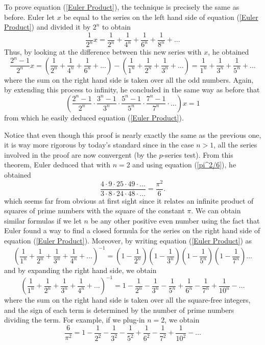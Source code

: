 To prove equation (\ref{Euler Product}), the technique is precisely the same as before. Euler let $x$ be equal to the series on the left hand side of equation (\ref{Euler Product}) and divided it by $2^n$ to obtain
$$\frac{1}{2^n}x = \frac{1}{2^n} + \frac{1}{4^n} + \frac{1}{6^n} + \frac{1}{8^n} + \dots$$
Thus, by looking at the difference between this new series with $x$, he obtained
$$\frac{2^n - 1}{2^n}x = \left(\frac{1}{2^n} + \frac{1}{4^n} + \frac{1}{6^n}  + \dots\right) - \left(\frac{1}{1^n} + \frac{1}{2^n} + \frac{1}{3^n} + \dots\right) = \frac{1}{1^n} + \frac{1}{3^n} + \frac{1}{5^n} + \dots$$
where the sum on the right hand side is taken over all the odd numbers. Again, by extending this process to infinity, he concluded in the same way as before that
$$\left(\frac{2^n - 1}{2^n}\cdot\frac{3^n - 1}{3^n} \cdot \frac{5^n - 1}{5^n} \cdot \frac{7^n - 1}{7^n} \cdot \dots\right) x = 1$$
from which he easily deduced equation (\ref{Euler Product}).

Notice that even though this proof is nearly exactly the same as the previous one, it is way more rigorous by today's standard since in the case $n > 1$, all the series involved in the proof are now convergent (by the $p$-series test). From this theorem, Euler deduced that with $n = 2$ and using equation (\ref{pi^2/6}), he obtained
\begin{equation} \label{product for pi^2/6}
    \frac{4 \cdot 9 \cdot 25 \cdot 49 \cdot \dots }{3 \cdot 8 \cdot 24 \cdot 48 \cdot \dots} = \frac{\pi^2}{6}.
\end{equation}
which seems far from obvious at first sight since it relates an infinite product of squares of prime numbers with the square of the constant $\pi$. We can obtain similar formulas if we let $n$ be any other positive even number using the fact that Euler found a way to find a closed formula for the series on the right hand side of equation (\ref{Euler Product}). Moreover, by writing equation (\ref{Euler Product}) as
$$ \left(\frac{1}{1^n} + \frac{1}{2^n} + \frac{1}{3^n} + \frac{1}{4^n} + \dots\right)^{-1} = \left(1 - \frac{1}{2^n}\right)\left(1 - \frac{1}{3^n}\right)\left(1 - \frac{1}{5^n}\right)\left(1 - \frac{1}{7^n}\right)\dots $$
and by expanding the right hand side, we obtain
\begin{equation}
    \left(\frac{1}{1^n} + \frac{1}{2^n} + \frac{1}{3^n} + \frac{1}{4^n} + \dots\right)^{-1} = 1 - \frac{1}{2^n} - \frac{1}{3^n} - \frac{1}{5^n} + \frac{1}{6^n} - \frac{1}{7^n} + \frac{1}{10^n} - \dots
\end{equation}
where the sum on the right hand side is taken over all the square-free integers, and the sign of each term is determined by the number of prime numbers dividing the term. For example, if we plug-in $n = 2$, we obtain
\begin{equation} \label{6/pi^2}
    \frac{6}{\pi^2} = 1 - \frac{1}{2^2} - \frac{1}{3^2} - \frac{1}{5^2} + \frac{1}{6^2} - \frac{1}{7^2} + \frac{1}{10^2} - \dots
\end{equation}

